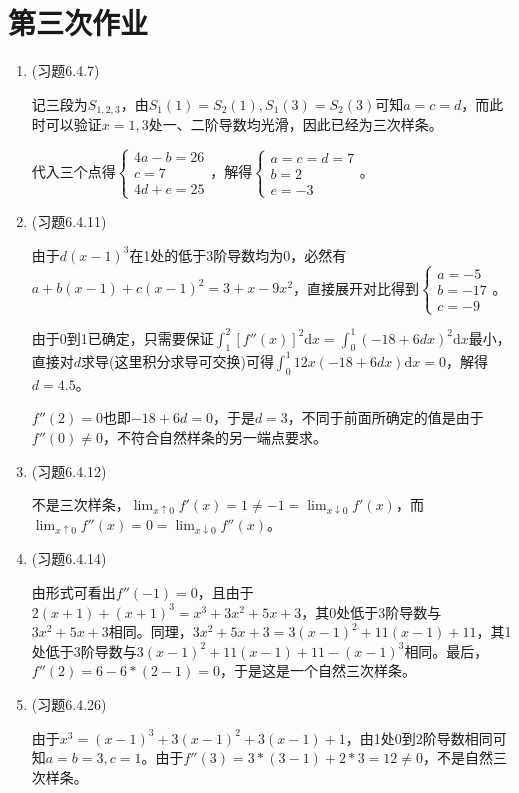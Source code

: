 \documentclass[a4paper,UTF8,fontset=windows]{ctexart}
\begin{document}
\section{第三次作业}
\begin{enumerate}
    \item (习题6.4.7)
    
    记三段为$S_{1,2,3}$，由$S_1(1)=S_2(1),S_1(3)=S_2(3)$可知$a=c=d$，而此时可以验证$x=1,3$处一、二阶导数均光滑，因此已经为三次样条。
    
    代入三个点得$\begin{cases}4a-b=26\\c=7\\4d+e=25\end{cases}$，解得$\begin{cases}a=c=d=7\\b=2\\e=-3\end{cases}$。
    
    \item (习题6.4.11)
    
    由于$d(x-1)^3$在1处的低于3阶导数均为0，必然有$a+b(x-1)+c(x-1)^2=3+x-9x^2$，直接展开对比得到$\begin{cases}a=-5\\b=-17\\c=-9\end{cases}$。
    
    由于0到1已确定，只需要保证$\int_1^2[f''(x)]^2\mathrm{d}x=\int_0^1(-18+6dx)^2\mathrm{d}x$最小，直接对$d$求导(这里积分求导可交换)可得$\int_0^1 12x(-18+6dx)\mathrm{d}x=0$，解得$d=4.5$。
    
    $f''(2)=0$也即$-18+6d=0$，于是$d=3$，不同于前面所确定的值是由于$f''(0)\ne0$，不符合自然样条的另一端点要求。
    
    \item (习题6.4.12)
    
    不是三次样条，$\lim_{x\uparrow0}f'(x)=1\ne-1=\lim_{x\downarrow0}f'(x)$，而$\lim_{x\uparrow0}f''(x)=0=\lim_{x\downarrow0}f''(x)$。
    
    \item (习题6.4.14)
    
    由形式可看出$f''(-1)=0$，且由于$2(x+1)+(x+1)^3=x^3+3x^2+5x+3$，其0处低于3阶导数与$3x^2+5x+3$相同。同理，$3x^2+5x+3=3(x-1)^2+11(x-1)+11$，其1处低于3阶导数与$3(x-1)^2+11(x-1)+11-(x-1)^3$相同。最后，$f''(2)=6-6*(2-1)=0$，于是这是一个自然三次样条。
    
    \item (习题6.4.26)
    
    由于$x^3=(x-1)^3+3(x-1)^2+3(x-1)+1$，由1处0到2阶导数相同可知$a=b=3,c=1$。由于$f''(3)=3*(3-1)+2*3=12\ne0$，不是自然三次样条。
\end{enumerate}
\end{document}
